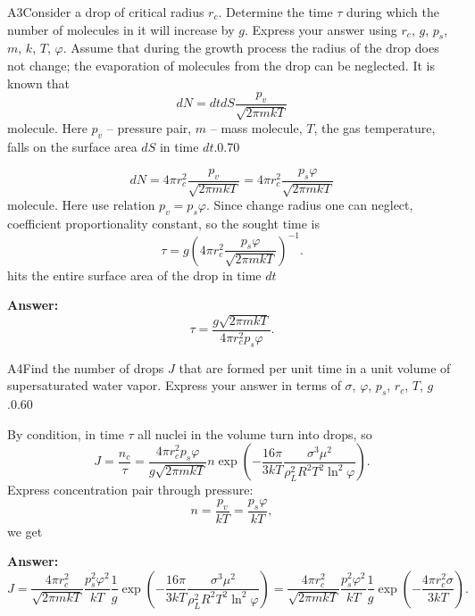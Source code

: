 \documentclass[11pt,a4paper]{article}
\begin{document}
\begin{solcard}{A3}{Consider a drop of critical radius $r_c$. Determine the time $\tau$ during which the number of molecules in it will increase by $g$. Express your answer using $r_c$, $g$, $p_s$, $m$, $k$, $T$, $\varphi$. Assume that during the growth process the radius of the drop does not change; the evaporation of molecules from the drop can be neglected. It is known that $$ dN = dt dS  \frac{p_v}{\sqrt{2\pi m k T}} $$ molecule. Here $p_v$ – pressure pair, $m$ – mass molecule, $T$, the gas temperature, falls on the surface area $dS$ in time $dt$.}{0.70}

$$ dN = 4\pi r_c^2 \frac{p_v}{\sqrt{2\pi m kT}} = 4\pi r_c^2 \frac{p_s \varphi}{\sqrt{2\pi m kT}} $$molecule. Here use relation $p_v = p_s \varphi$. Since change radius one can neglect, coefficient proportionality constant, so the sought time is $$ \tau = g \left( 4\pi r_c^2 \frac{p_s \varphi}{\sqrt{2\pi m kT}} \right)^{-1}. $$ hits the entire surface area of the drop in time $dt$

\par\smallskip\noindent\textbf{Answer:} $$ \tau = \frac{g \sqrt{2\pi m kT}}{4\pi r_c^2 p_s \varphi}. $$
\end{solcard}

\begin{solcard}{A4}{Find the number of drops $J$ that are formed per unit time in a unit volume of supersaturated water vapor. Express your answer in terms of $\sigma$, $\varphi$, $p_s$, $r_c$, $T$, $g$.}{0.60}

By condition, in time $\tau$ all nuclei in the volume turn into drops, so $$ J = \frac{n_c}{\tau} = \frac{4\pi r_c^2 p_s \varphi}{g \sqrt{2\pi m kT}} n\exp\left( -  \frac{16 \pi}{3 kT} \frac{\sigma^3 \mu^2}{\rho_L^2 R^2 T^2 \ln^2 \varphi}\right). $$Express concentration pair through pressure: $$ n = \frac{p_v}{k T} = \frac{p_s \varphi}{k T}, $$ we get

\par\smallskip\noindent\textbf{Answer:} $$ J =  \frac{4\pi r_c^2 }{ \sqrt{2\pi m kT}} \frac{p_s^2 \varphi^2}{k T} \frac{1}{g}\exp\left( -  \frac{16 \pi}{3 kT} \frac{\sigma^3 \mu^2}{\rho_L^2 R^2 T^2 \ln^2 \varphi}\right) = \frac{4\pi r_c^2 }{ \sqrt{2\pi m kT}} \frac{p_s^2 \varphi^2}{k T} \frac{1}{g}\exp\left( -  \frac{4\pi r_c^2 \sigma}{3 k T}\right). $$
\end{solcard}
\end{document}
